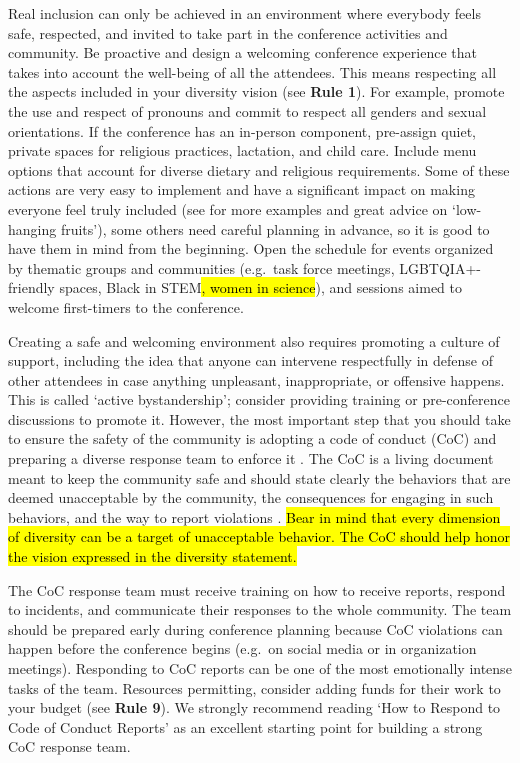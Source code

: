 \documentclass[10pt,letterpaper]{article}
\begin{document}
Real inclusion can only be achieved in an environment where everybody feels safe, respected, and invited to take part in the conference activities and community. Be proactive and design a welcoming conference experience that takes into account the well-being of all the attendees. This means respecting all the aspects included in your diversity vision (see \textbf{Rule 1}). For example, promote the use and respect of pronouns and commit to respect all genders and sexual orientations. If the conference has an in-person component, pre-assign quiet, private spaces for religious practices, lactation, and child care. Include menu options that account for diverse dietary and religious requirements.
Some of these actions are very easy to implement and have a significant impact on making everyone feel truly included (see \cite{numfocus_discover_2021} for more examples and great advice on `low-hanging fruits'), some others need careful planning in advance, so it is good to have them in mind from the beginning.
Open the schedule for events organized by thematic groups and communities (e.g.\ task force meetings, LGBTQIA+-friendly spaces, Black in STEM\hl{, women in science}), and sessions aimed to welcome first-timers to the conference.

Creating a safe and welcoming environment also requires promoting a culture of support, including the idea that anyone can intervene respectfully in defense of other attendees in case anything unpleasant, inappropriate, or offensive happens.
This is called `active bystandership'; consider providing training or pre-conference discussions to promote it.
However, the most important step that you should take to ensure the safety of the community is
adopting a code of conduct (CoC) and preparing a diverse response team to enforce it \cite{favaroYourScienceConference2016}.
The CoC is a living document meant to keep the community safe and should state clearly the behaviors that are deemed unacceptable by the community, the consequences for engaging in such behaviors, and the way to report violations \cite{auroraHowRespondCode2019}. 
\hl{Bear in mind that every dimension of diversity can be a target of unacceptable behavior. The CoC should help honor the vision expressed in the diversity statement.} 
 

The CoC response team must receive training on how to receive reports, respond to incidents, and communicate their responses to the whole community. The team should be prepared early during conference planning because CoC violations can happen before the conference begins (e.g.\ on social media or in organization meetings).  
Responding to CoC reports can be one of the most emotionally intense tasks of the team. Resources permitting, consider adding funds for their work to your budget (see \textbf{Rule 9}).
We strongly recommend reading `How to Respond to Code of Conduct Reports' \cite{auroraHowRespondCode2019} as an excellent starting point for building a strong CoC response team. 
 
\end{document}
